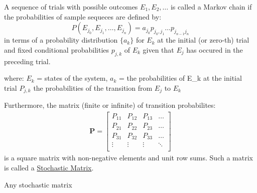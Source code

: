 \begin{definition}
A sequence of trials with possible outcomes $E_1, E_2, \dots$ is called a Markov chain if the probabilities of sample sequeces are defined by: 
$$ P(E_{j_0}, E_{j_1}, \dots , E_{j_n}) = a_{j_0}p_{j_0, j_1} \dots p_{j_{n-1} j_n}$$ in terms of a probability distribution $\{a_k\}$ for $E_k$ at the initial (or zero-th) trial and fixed conditional probabilities $p_{j, k}$ of $E_k$ given that $E_j$ has occured in the preceding trial.
\end{definition}
where: $E_k$ = states of the system, $a_k$ = the probabilities of E_k at the initial trial $P_{j, k}$ the probabilities of the transition from $E_j$ to $E_k$

Furthermore, the matrix (finite or infinite) of transition probabilites: 
\begin{align*}
    \mathbf{P} = \begin{bmatrix} 
                    P_{11} & P_{12} & P_{13} & \dots \\
                    P_{21} & P_{22} & P_{23} & \dots \\
                    P_{31} & P_{32} & P_{33} & \dots \\
                    \vdots & \vdots & \vdots & \ddots \\
                \end{bmatrix}
\end{align*}
is a square matrix with non-negative elements and unit row sums. Such a matrix is called a \underline{Stochastic Matrix}.

Any stochastic matrix 
